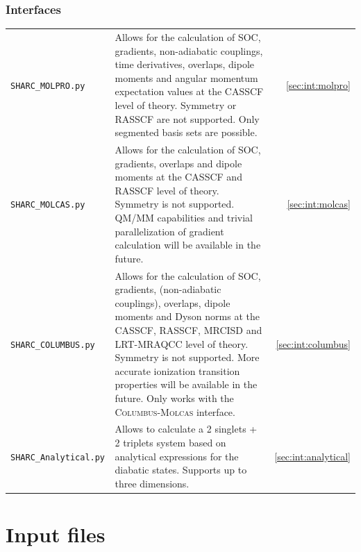 \documentclass[a4paper,11pt,DIV=15,openany,twoside=false]{scrbook}
\newcommand{\sharc}{\textsc{Sharc}}
\begin{document}
\subsection{Interfaces}

\begin{tabular}{>{\tt}lp{9.5cm}r}
  SHARC\_MOLPRO.py      &Allows for the calculation of SOC, gradients, non-adiabatic couplings, time derivatives, overlaps, dipole moments and angular momentum expectation values at the CASSCF level of theory. Symmetry or RASSCF are not supported. Only segmented basis sets are possible.   &\ref{sec:int:molpro}\\
  SHARC\_MOLCAS.py      &Allows for the calculation of SOC, gradients, overlaps and dipole moments at the CASSCF and RASSCF level of theory. Symmetry is not supported. QM/MM capabilities and trivial parallelization of gradient calculation will be available in the future.         &\ref{sec:int:molcas}\\
  SHARC\_COLUMBUS.py    &Allows for the calculation of SOC, gradients, (non-adiabatic couplings), overlaps, dipole moments and Dyson norms at the CASSCF, RASSCF, MRCISD and LRT-MRAQCC level of theory. Symmetry is not supported. More accurate ionization transition properties will be available in the future. Only works with the \textsc{Columbus}-\textsc{Molcas} interface.                  &\ref{sec:int:columbus}\\
  SHARC\_Analytical.py  &Allows to calculate a 2 singlets + 2 triplets system based on analytical expressions for the diabatic states. Supports up to three dimensions.         &\ref{sec:int:analytical}\\
\end{tabular}




\chapter{Input files}\label{chap:input}

\end{document}

